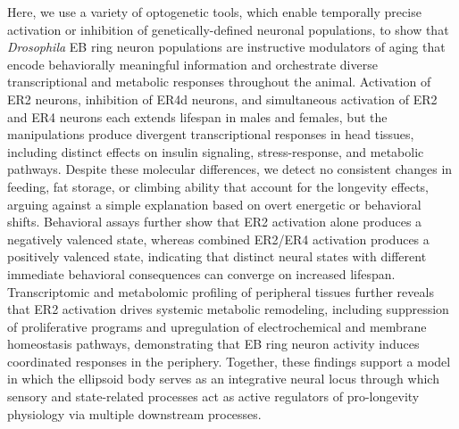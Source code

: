 Here, we use a variety of optogenetic tools, which enable temporally precise activation or inhibition of genetically-defined neuronal populations, to show that \textit{Drosophila} EB ring neuron populations are instructive modulators of aging that encode behaviorally meaningful information and orchestrate diverse transcriptional and metabolic responses throughout the animal. 
Activation of ER2 neurons, inhibition of ER4d neurons, and simultaneous activation of ER2 and ER4 neurons each extends lifespan in males and females, but the manipulations produce divergent transcriptional responses in head tissues, including distinct effects on insulin signaling, stress-response, and metabolic pathways. 
Despite these molecular differences, we detect no consistent changes in feeding, fat storage, or climbing ability that account for the longevity effects, arguing against a simple explanation based on overt energetic or behavioral shifts. 
Behavioral assays further show that ER2 activation alone produces a negatively valenced state, whereas combined ER2/ER4 activation produces a positively valenced state, indicating that distinct neural states with different immediate behavioral consequences can converge on increased lifespan. 
Transcriptomic and metabolomic profiling of peripheral tissues further reveals that ER2 activation drives systemic metabolic remodeling, including suppression of proliferative programs and upregulation of electrochemical and membrane homeostasis pathways, demonstrating that EB ring neuron activity induces coordinated responses in the periphery.
Together, these findings support a model in which the ellipsoid body serves as an integrative neural locus through which sensory and state-related processes act as active regulators of pro-longevity physiology via multiple downstream processes.